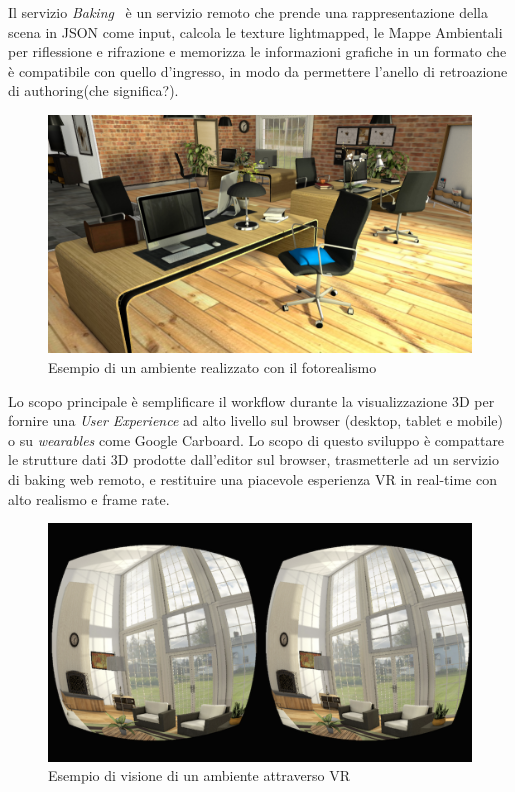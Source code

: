 Il servizio \emph{Baking}~\cite{baking} \`e un servizio remoto che prende una rappresentazione della scena in JSON come input,
calcola le texture lightmapped, le Mappe Ambientali per riflessione e rifrazione e memorizza le informazioni grafiche
in un formato che \`e compatibile con quello d'ingresso, in modo da permettere l'anello di retroazione di authoring(che significa?).\\

\begin{figure}[htbp] %
   \centering
   \includegraphics[width=1\linewidth]{images/explorer-a-1}
   \caption{Esempio di un ambiente realizzato con il fotorealismo}
   \label{fig:revit}
   \end{figure}

Lo scopo principale \`e semplificare il workflow durante la visualizzazione 3D per fornire una \emph{User Experience}
ad alto livello sul browser (desktop, tablet e mobile) o su \emph{wearables} come Google Carboard.
\newpage
Lo scopo di questo sviluppo è compattare le strutture dati 3D prodotte dall'editor sul browser, trasmetterle ad un servizio di baking web remoto,
e restituire una piacevole esperienza VR in real-time con alto realismo e frame rate.

\begin{figure}[htbp] %
   \centering
   \includegraphics[width=1\linewidth]{images/vr}
   \caption{Esempio di visione di un ambiente attraverso VR}
   \label{fig:revit}
   \end{figure}

